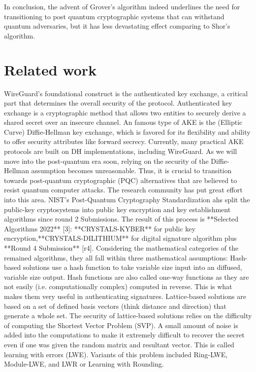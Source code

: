 In conclusion, the advent of Grover's algorithm indeed underlines the need for transitioning to post quantum cryptographic systems that can withstand quantum adversaries, but it has less devastating effect comparing to Shor's algorithm.

\section{Related work}
WireGuard's foundational construct is the authenticated key exchange, a critical part that determines the overall security of the protocol. Authenticated key exchange is a cryptographic method that allows two entities to securely derive a shared secret over an insecure channel. An famous type of AKE  is the (Elliptic Curve) Diffie-Hellman key exchange, which is favored for its flexibility and ability to offer security attributes like forward secrecy. Currently, many practical AKE protocols are built on DH implementations, including WireGuard. 
As we will move into the post-quantum era soon, relying on the security of the Diffie-Hellman assumption becomes unreasonable. Thus, it is crucial to transition towards post-quantum cryptographic (PQC) alternatives that are believed to resist quantum computer attacks. The research community has put great effort into this area. NIST's Post-Quantum Cryptography Standardization ahs split the public-key cryptosystems into public key encryption and key establishment algorithms since round 2 Submissions. The result of this process is **Selected Algorithms 2022** [3]: **CRYSTALS-KYBER** for public key encryption,**CRYSTALS-DILITHIUM** for digital signature algorithm plus **Round 4 Submission** [r4]. Considering the mathematical categories of the remained algorithms, they all fall within three mathematical assumptions:
Hash-based solutions use a hash function to take variable size input into an diffused, variable size output. Hash functions are also called one-way functions as they are not easily (i.e. computationally complex) computed in reverse. This is what makes them very useful in authenticating signatures. 
Lattice-based solutions are based on a set of  defined basis vectors (think distance and  direction) that generate a whole set. The security of lattice-based solutions relies on the difficulty of computing the Shortest Vector Problem (SVP).  A small amount of noise is added into the computations to make it extremely difficult to recover the secret even if one was given the random matrix and resultant vector. This is called learning with errors (LWE). Variants of this problem included Ring-LWE, Module-LWE, and LWR or Learning with Rounding.

